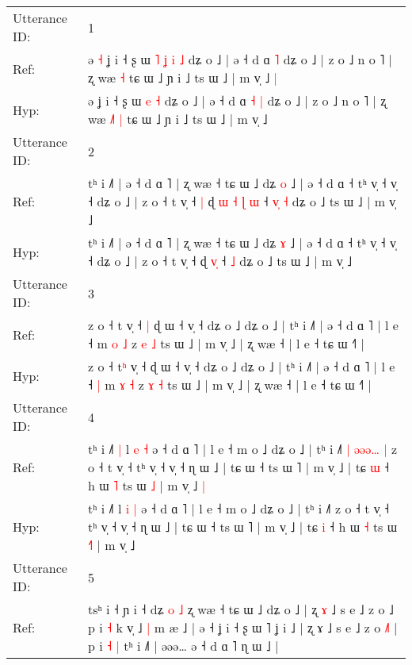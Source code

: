 \documentclass[10pt]{article}
\DeclareRobustCommand{\hl}[1]{{\textcolor{red}{#1}}}
\begin{document}
\begin{longtable}{ll}
\toprule
Utterance ID: & 1 \\
Ref: & ə\hl{ }\hl{˧} ʝ i ˧ ʂ ɯ\hl{ }\hl{˥}\hl{ }\hl{ʝ} \hl{i} \hl{˩} dʑ o ˩ | ə ˧ d ɑ\hl{}\hl{} \hl{˥} dʑ o ˩ | z o ˩ n o ˥ | ʐ wæ\hl{}\hl{}\hl{} \hl{˧} tɕ ɯ ˩ ɲ i ˩ ts ɯ ˩ | m v̩ ˩\hl{ }\hl{|}
 \\
Hyp: & ə\hl{}\hl{} ʝ i ˧ ʂ ɯ\hl{}\hl{}\hl{}\hl{} \hl{e} \hl{˧} dʑ o ˩ | ə ˧ d ɑ\hl{ }\hl{˧} \hl{|} dʑ o ˩ | z o ˩ n o ˥ | ʐ wæ\hl{ }\hl{˩}\hl{˥} \hl{|} tɕ ɯ ˩ ɲ i ˩ ts ɯ ˩ | m v̩ ˩\hl{}\hl{}
 \\
\midrule
Utterance ID: & 2 \\
Ref: & tʰ i ˩˥ | ə ˧ d ɑ ˥ | ʐ wæ ˧ tɕ ɯ ˩ dʑ \hl{o} ˩ | ə ˧ d ɑ ˧ tʰ v̩ ˧ v̩ ˧ dʑ o ˩ | z o ˧ t v̩ ˧\hl{ }\hl{|} ɖ\hl{ }\hl{ɯ}\hl{ }\hl{˧} \hl{ɭ}\hl{ }\hl{ɯ} ˧\hl{ }\hl{v}\hl{̩} \hl{˧} dʑ o ˩ ts ɯ ˩ | m v̩ ˩
 \\
Hyp: & tʰ i ˩˥ | ə ˧ d ɑ ˥ | ʐ wæ ˧ tɕ ɯ ˩ dʑ \hl{ɤ} ˩ | ə ˧ d ɑ ˧ tʰ v̩ ˧ v̩ ˧ dʑ o ˩ | z o ˧ t v̩ ˧\hl{}\hl{} ɖ\hl{}\hl{}\hl{}\hl{} \hl{}\hl{v}\hl{̩} ˧\hl{}\hl{}\hl{} \hl{˩} dʑ o ˩ ts ɯ ˩ | m v̩ ˩
 \\
\midrule
Utterance ID: & 3 \\
Ref: & z o ˧ t\hl{} v̩ ˧\hl{ }\hl{|} ɖ ɯ ˧ v̩ ˧ dʑ o ˩ dʑ o ˩ | tʰ i ˩˥ | ə ˧ d ɑ ˥ | l e ˧\hl{}\hl{} m \hl{o} \hl{˩} z \hl{e} \hl{˩} ts ɯ ˩ | m v̩ ˩ | ʐ wæ ˧ | l e ˧ tɕ ɯ ˧˥ |
 \\
Hyp: & z o ˧ t\hl{ʰ} v̩ ˧\hl{}\hl{} ɖ ɯ ˧ v̩ ˧ dʑ o ˩ dʑ o ˩ | tʰ i ˩˥ | ə ˧ d ɑ ˥ | l e ˧\hl{ }\hl{|} m \hl{ɤ} \hl{˧} z \hl{ɤ} \hl{˧} ts ɯ ˩ | m v̩ ˩ | ʐ wæ ˧ | l e ˧ tɕ ɯ ˧˥ |
 \\
\midrule
Utterance ID: & 4 \\
Ref: & tʰ i ˩˥\hl{ }\hl{|} l \hl{e} \hl{˧} ə ˧ d ɑ ˥ | l e ˧ m o ˩ dʑ o ˩ | tʰ i ˩˥\hl{ }\hl{|}\hl{ }\hl{ə}\hl{ə}\hl{ə}\hl{…}\hl{ }\hl{|} z o ˧ t v̩ ˧ tʰ v̩ ˧ v̩ ˧ ɳ ɯ ˩ | tɕ ɯ ˧ ts ɯ ˥ | m v̩ ˩ | tɕ \hl{ɯ} ˧ h ɯ \hl{˥} ts ɯ \hl{}\hl{˩} | m v̩ ˩\hl{ }\hl{|}
 \\
Hyp: & tʰ i ˩˥\hl{}\hl{} l \hl{i} \hl{|} ə ˧ d ɑ ˥ | l e ˧ m o ˩ dʑ o ˩ | tʰ i ˩˥\hl{}\hl{}\hl{}\hl{}\hl{}\hl{}\hl{}\hl{}\hl{} z o ˧ t v̩ ˧ tʰ v̩ ˧ v̩ ˧ ɳ ɯ ˩ | tɕ ɯ ˧ ts ɯ ˥ | m v̩ ˩ | tɕ \hl{i} ˧ h ɯ \hl{˧} ts ɯ \hl{˧}\hl{˥} | m v̩ ˩\hl{}\hl{}
 \\
\midrule
Utterance ID: & 5 \\
Ref: & tsʰ i ˧ ɲ i ˧ dʑ \hl{o} \hl{˩} ʐ wæ ˧ tɕ ɯ ˩ dʑ o ˩ | ʐ \hl{ɤ} ˩ s e ˩ z o ˩ p i \hl{˧} k v̩ ˩\hl{ }\hl{|} m æ ˩ | ə ˧ ʝ i ˧ ʂ ɯ ˥ ʝ i ˩ | ʐ ɤ ˩ s e ˩ z o \hl{˩}\hl{˥} | p i\hl{ }\hl{˧} \hl{|} tʰ i ˩˥ | əəə… ə ˧ d ɑ ˥ ɳ ɯ ˩ |

\end{longtable}
\end{document}
